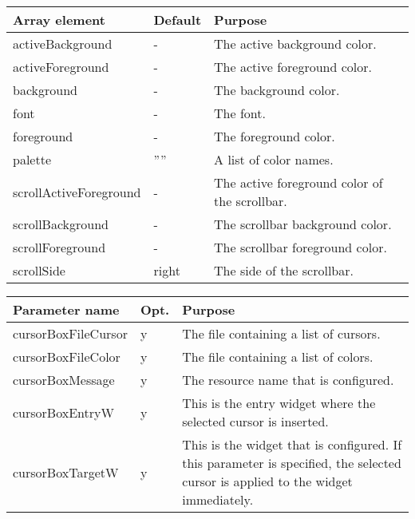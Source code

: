 {\newpage
\clearpage
\samepage \begin{tabular}{|l|l|p{5.5cm}|} \hline
Array element          & Default & Purpose\\  \hline
activeBackground       & -       & The active background
                                   color.\\  \hline
activeForeground       & -       & The active foreground
                                   color.\\  \hline
background             & -       & The background color.\\  \hline
font                   & -       & The font.\\  \hline
foreground             & -       & The foreground color.\\  \hline
palette                & ''''    & A list of color names.\\  \hline
scrollActiveForeground & -       & The active foreground
                                   color of the scrollbar.\\  \hline 
scrollBackground       & -       & The scrollbar background
                                   color.\\  \hline
scrollForeground       & -       & The scrollbar foreground
                                   color.\\  \hline
scrollSide             & right   & The side of the
                                   scrollbar.\\  \hline
\end{tabular}
}

{\newpage
\clearpage
\samepage \begin{figure}[ht]
  \centerline{
  \epsfysize=6cm
  }
  
  \label{fig:ColorBox}
\end{figure}
}

{\newpage
\clearpage
\samepage \begin{tabular}{|l|l|p{6.3cm}|} \hline
Parameter name      & Opt. & Purpose \\  \hline
cursorBoxFileCursor & y    & The file containing a list of
                             cursors. \\  \hline 
cursorBoxFileColor  & y    & The file containing a list of
                             colors. \\  \hline
cursorBoxMessage    & y    & The resource name that is 
                             configured. \\  \hline
cursorBoxEntryW     & y    & This is the entry widget where
                             the selected cursor is
                             inserted. \\  \hline
cursorBoxTargetW    & y    & This is the widget that is
                             configured. If this parameter
                             is specified, the selected
                             cursor is applied to the widget
                             immediately. \\  \hline
\end{tabular}
}

